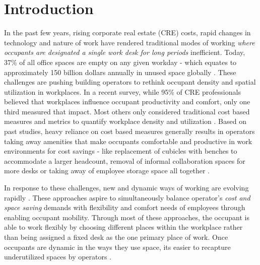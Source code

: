 \documentclass[]{interact}
\theoremstyle{plain}%
\theoremstyle{definition}
\theoremstyle{remark}
\begin{document}
\section{Introduction}

In the past few years, rising corporate real estate (CRE) costs, rapid changes in technology and nature of work have rendered traditional modes of working \emph{where occupants are designated a single work desk for long periods} inefficient. Today, 37\% of all office spaces are empty on any given workday \citep{jll} - which equates to approximately 150 billion dollars annually in unused space globally \citep{cbre}. These challenges are pushing building operators to rethink occupant density and spatial utilization in workplaces. In a recent survey, while 95\% of CRE professionals believed that workplaces influence occupant productivity and comfort, only one third measured that impact. Most others only considered traditional cost based measures and metrics to quantify workplace density and utilization \citep{gensler}. Based on past studies, heavy reliance on cost based measures generally results in operators taking away amenities that make occupants comfortable and productive in work environments for cost savings - like replacement of cubicles with benches to accommodate a larger headcount, removal of informal collaboration spaces for more desks or taking away of employee storage space all together \citep{cbre}.

 

In response to these challenges, new and dynamic ways of working are evolving rapidly . These approaches aspire to simultaneously balance operator's \emph{cost and space saving} demands with flexibility and comfort needs of employees through enabling occupant mobility. Through most of these approaches, the occupant is able to work flexibly by choosing different places within the workplace rather than being assigned a fixed desk as the one primary place of work. Once occupants are dynamic in the ways they use space, its easier to recapture underutilized spaces by operators \citep{cbre}.
\end{document}

